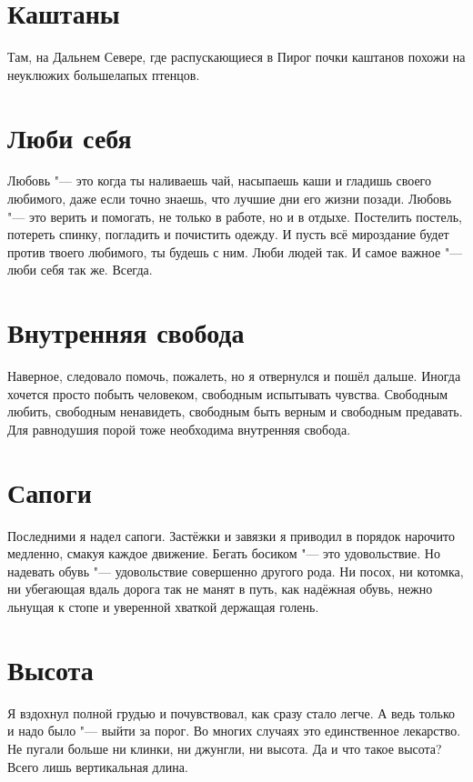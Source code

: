 \section{Каштаны}

Там, на Дальнем Севере, где распускающиеся в Пирог почки каштанов похожи на неуклюжих большелапых птенцов.

\section{Люби себя}

Любовь "--- это когда ты наливаешь чай, насыпаешь каши и гладишь своего любимого, даже если точно знаешь, что лучшие дни его жизни позади.
Любовь "--- это верить и помогать, не только в работе, но и в отдыхе.
Постелить постель, потереть спинку, погладить и почистить одежду.
И пусть всё мироздание будет против твоего любимого, ты будешь с ним.
Люби людей так.
И самое важное "--- люби себя так же.
Всегда.

\section{Внутренняя свобода}

Наверное, следовало помочь, пожалеть, но я отвернулся и пошёл дальше.
Иногда хочется просто побыть человеком, свободным испытывать чувства.
Свободным любить, свободным ненавидеть, свободным быть верным и свободным предавать.
Для равнодушия порой тоже необходима внутренняя свобода.

\section{Сапоги}

Последними я надел сапоги.
Застёжки и завязки я приводил в порядок нарочито медленно, смакуя каждое движение.
Бегать босиком "--- это удовольствие.
Но надевать обувь "--- удовольствие совершенно другого рода.
Ни посох, ни котомка, ни убегающая вдаль дорога так не манят в путь, как надёжная обувь, нежно льнущая к стопе и уверенной хваткой держащая голень.

\section{Высота}

Я вздохнул полной грудью и почувствовал, как сразу стало легче.
А ведь только и надо было "--- выйти за порог.
Во многих случаях это единственное лекарство.
Не пугали больше ни клинки, ни джунгли, ни высота.
Да и что такое высота?
Всего лишь вертикальная длина.

